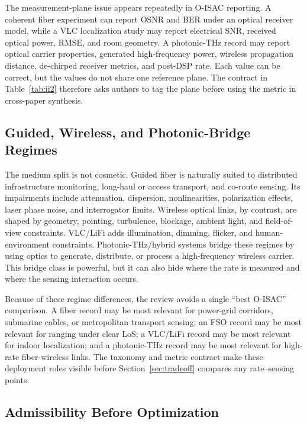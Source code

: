 \documentclass[letterpaper,journal]{IEEEtran}
\begin{document}
The measurement-plane issue appears repeatedly in O-ISAC reporting. A coherent fiber experiment can report OSNR and BER under an optical receiver model, while a VLC localization study may report electrical SNR, received optical power, RMSE, and room geometry. A photonic-THz record may report optical carrier properties, generated high-frequency power, wireless propagation distance, de-chirped receiver metrics, and post-DSP rate. Each value can be correct, but the values do not share one reference plane. The contract in Table~\ref{tab:ii2} therefore asks authors to tag the plane before using the metric in cross-paper synthesis.

\subsection{Guided, Wireless, and Photonic-Bridge Regimes}

The medium split is not cosmetic. Guided fiber is naturally suited to distributed infrastructure monitoring, long-haul or access transport, and co-route sensing. Its impairments include attenuation, dispersion, nonlinearities, polarization effects, laser phase noise, and interrogator limits. Wireless optical links, by contrast, are shaped by geometry, pointing, turbulence, blockage, ambient light, and field-of-view constraints. VLC/LiFi adds illumination, dimming, flicker, and human-environment constraints. Photonic-THz/hybrid systems bridge these regimes by using optics to generate, distribute, or process a high-frequency wireless carrier. This bridge class is powerful, but it can also hide where the rate is measured and where the sensing interaction occurs.

Because of these regime differences, the review avoids a single ``best O-ISAC'' comparison. A fiber record may be most relevant for power-grid corridors, submarine cables, or metropolitan transport sensing; an FSO record may be most relevant for ranging under clear LoS; a VLC/LiFi record may be most relevant for indoor localization; and a photonic-THz record may be most relevant for high-rate fiber-wireless links. The taxonomy and metric contract make these deployment roles visible before Section~\ref{sec:tradeoff} compares any rate--sensing points.

\subsection{Admissibility Before Optimization}
\end{document}
